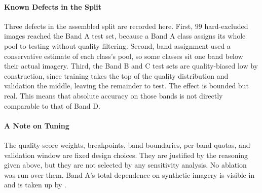 \paragraph{Known Defects in the Split}
Three defects in the assembled split are recorded here. First, $99$ hard-excluded images reached the Band A test set, because a Band A class assigns its whole pool to testing without quality filtering. Second, band assignment used a conservative estimate of each class's pool, so some classes sit one band below their actual imagery. Third, the Band B and C test sets are quality-biased low by construction, since training takes the top of the quality distribution and validation the middle, leaving the remainder to test. The effect is bounded but real. This means that absolute accuracy on those bands is not directly comparable to that of Band D.

\paragraph{A Note on Tuning}
The quality-score weights, breakpoints, band boundaries, per-band quotas, and validation window are fixed design choices. They are justified by the reasoning given above, but they are not selected by any sensitivity analysis. No ablation was run over them. Band A's total dependence on synthetic imagery is visible in  and is taken up by .
